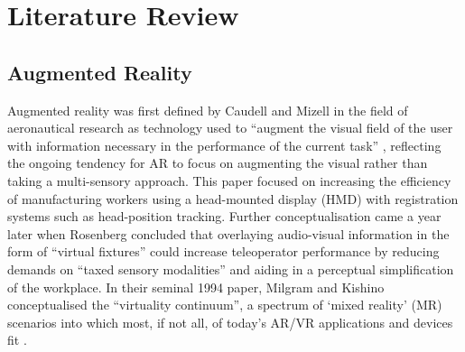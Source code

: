 \section{Literature Review}                     \label{sec: area-literature}
\subsection{Augmented Reality}                  \label{sec: area-literature-ar}
Augmented reality was first defined by Caudell and Mizell in the field of aeronautical research as technology used to “augment the visual field of the user with information necessary in the performance of the current task” \citeyearpar{caudell1992}, reflecting the ongoing tendency for AR to focus on augmenting the visual rather than taking a multi-sensory approach. This paper focused on increasing the efficiency of manufacturing workers using a head-mounted display (HMD) with registration systems such as head-position tracking. Further conceptualisation came a year later when Rosenberg \citeyearpar{rosenberg1993} concluded that overlaying audio-visual information in the form of “virtual fixtures” could increase teleoperator performance by reducing demands on “taxed sensory modalities” and aiding in a perceptual simplification of the workplace. In their seminal 1994 paper, Milgram and Kishino conceptualised the “virtuality continuum”, a spectrum of ‘mixed reality' (MR) scenarios into which most, if not all, of today’s AR/VR applications and devices fit \citeyearpar{milgram1994}.

